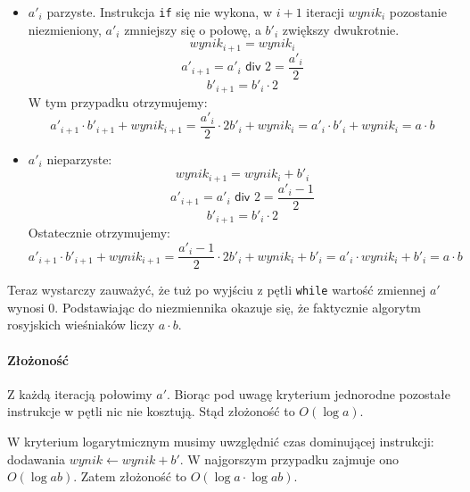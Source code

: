 \begin{itemize}
    \item $a'_i$ parzyste. Instrukcja \texttt{if} się nie wykona, w $i+1$ iteracji $wynik_i$ pozostanie niezmieniony, $a'_i$ zmniejszy się o połowę, a $b'_i$ zwiększy dwukrotnie. 
    \[
      wynik_{i+1} = wynik_i
    \]
    \[
      a'_{i+1} = a'_i \textsf{ div } 2 = \frac{a'_i}{2}
    \]
    \[
      b'_{i+1} = b'_i \cdot 2
    \]
    W tym przypadku otrzymujemy:
    \[
      a'_{i+1} \cdot b'_{i+1} + wynik_{i+1} = \frac{a'_i}{2} \cdot 2 b'_i + wynik_i = a'_i \cdot b'_i + wynik_i = a \cdot b
    \]

    \item $a'_i$ nieparzyste:
    \[
      wynik_{i+1} = wynik_i + b'_i
    \]
    \[
      a'_{i+1} = a'_i \textsf{ div } 2 = \frac{a'_i-1}{2}
    \]
    \[
      b'_{i+1} = b'_i \cdot 2
    \]
    Ostatecznie otrzymujemy:
    \[
      a'_{i+1} \cdot b'_{i+1} + wynik_{i+1} = \frac{a'_i-1}{2} \cdot 2 b'_i + wynik_i +b'_i = a'_i \cdot wynik_i + b'_i= a \cdot b
    \]

\end{itemize}

Teraz wystarczy zauważyć, że tuż po wyjściu z pętli \texttt{while} wartość zmiennej $a'$ wynosi $0$.
Podstawiając do niezmiennika okazuje się, że faktycznie algorytm rosyjskich wieśniaków liczy $a \cdot b$.

\paragraph{Złożoność}

Z każdą iteracją połowimy $a'$. 
Biorąc pod uwagę kryterium jednorodne pozostałe instrukcje w pętli nic nie kosztują. 
Stąd złożoność to $O(\log a)$.

W kryterium logarytmicznym musimy uwzględnić czas dominującej instrukcji: dodawania  $wynik \leftarrow wynik + b'$. 
W najgorszym przypadku zajmuje ono $O(\log ab)$. Zatem złożoność to $O(\log a \cdot \log ab)$.

